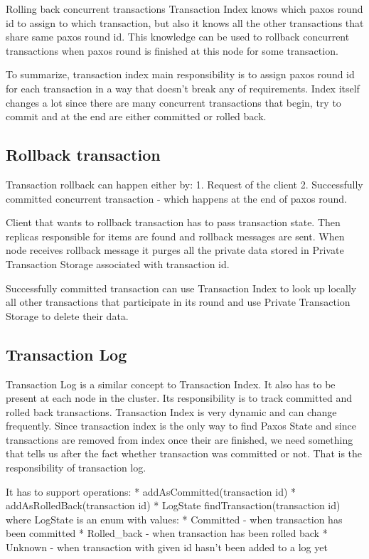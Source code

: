Rolling back concurrent transactions
Transaction Index knows which paxos round id to assign to which transaction, but also it knows all the other transactions that share same paxos round id. This knowledge can be used to rollback concurrent transactions when paxos round is finished at this node for some transaction.


To summarize, transaction index main responsibility is to assign paxos round id for each transaction in a way that doesn’t break any of requirements. Index itself changes a lot since there are many concurrent transactions that begin, try to commit and at the end are either committed or rolled back. 




\subsection{Rollback transaction}
Transaction rollback can happen either by:
1. Request of the client
2. Successfully committed concurrent transaction - which happens at the end of paxos round.


Client that wants to rollback transaction has to pass transaction state. Then replicas responsible for items are found and rollback messages are sent. When node receives rollback message it purges all the private data stored in Private Transaction Storage associated with transaction id.


Successfully committed transaction can use Transaction Index to look up locally all other transactions that participate in its round and use Private Transaction Storage to delete their data.


\subsection{Transaction Log}
Transaction Log is a similar concept to Transaction Index. It also has to be present at each node in the cluster. Its responsibility is to track committed and rolled back transactions. Transaction Index is very dynamic and can change frequently. Since transaction index is the only way to find Paxos State and since transactions are removed from index once their are finished, we need something that tells us after the fact whether transaction was committed or not. That is the responsibility of transaction log.


It has to support operations:
* addAsCommitted(transaction id)
* addAsRolledBack(transaction id)
* LogState findTransaction(transaction id) where LogState is an enum with values: 
   * Committed - when transaction has been committed
   * Rolled_back - when transaction has been rolled back
   * Unknown - when transaction with given id hasn’t been added to a log yet


